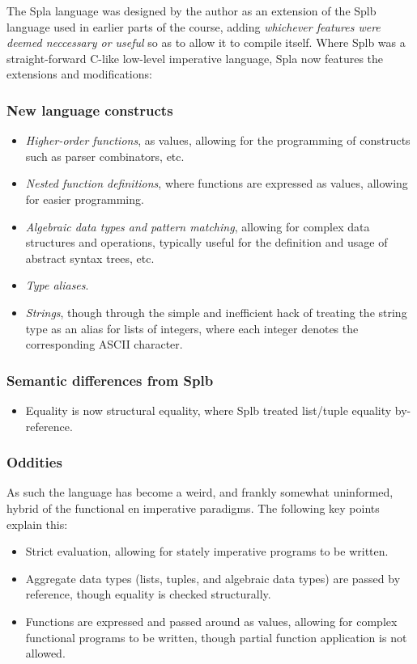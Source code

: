 \documentclass[english,10pt]{article} %
\theoremstyle{definitionstyle}
\theoremstyle{lemmastyle}
\begin{document}
The Spla language was designed by the author as an extension of the Splb language used in earlier parts of the course, adding \emph{whichever features were deemed neccessary or useful} so as to allow it to compile itself. Where Splb was a straight-forward C-like low-level imperative language, Spla now features the extensions and modifications:

\subsubsection*{New language constructs}

\begin{itemize}
\item \emph{Higher-order functions}, as values, allowing for the programming of constructs such as parser combinators, etc.
\item \emph{Nested function definitions}, where functions are expressed as values, allowing for easier programming.
\item \emph{Algebraic data types and pattern matching}, allowing for complex data structures and operations, typically useful for the definition and usage of abstract syntax trees, etc.
\item \emph{Type aliases}.
\item \emph{Strings}, though through the simple and inefficient hack of treating the string type as an alias for lists of integers, where each integer denotes the corresponding ASCII character.
\end{itemize}

\subsubsection*{Semantic differences from Splb}

\begin{itemize}
\item Equality is now structural equality, where Splb treated list/tuple equality by-reference.
\end{itemize}

\subsubsection*{Oddities}

As such the language has become a weird, and frankly somewhat uninformed, hybrid of the functional en imperative paradigms. The following key points explain this:

\begin{itemize}
\item Strict evaluation, allowing for stately imperative programs to be written.
\item Aggregate data types (lists, tuples, and algebraic data types) are passed by reference, though equality is checked structurally.
\item Functions are expressed and passed around as values, allowing for complex functional programs to be written, though partial function application is not allowed.
\end{itemize}
\end{document}
